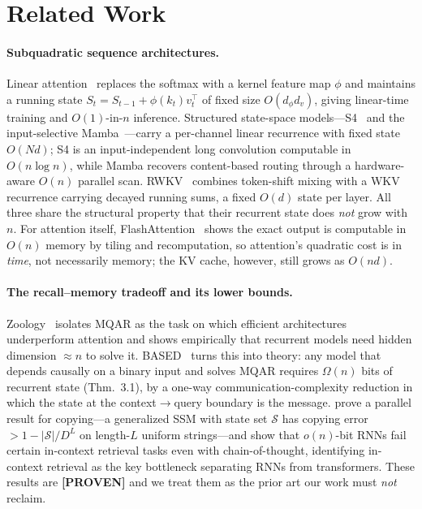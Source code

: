 \section{Related Work}

\paragraph{Subquadratic sequence architectures.}
Linear attention~\citep{katharopoulos2020transformers} replaces the softmax with a kernel
feature map $\phi$ and maintains a running state $S_t = S_{t-1} + \phi(k_t) v_t^\top$ of fixed
size $O(d_\phi d_v)$, giving linear-time training and $O(1)$-in-$n$ inference. Structured
state-space models---S4~\citep{gu2022s4} and the input-selective
Mamba~\citep{gu2023mamba}---carry a per-channel linear recurrence with fixed state $O(Nd)$;
S4 is an input-independent long convolution computable in $O(n\log n)$, while Mamba recovers
content-based routing through a hardware-aware $O(n)$ parallel scan.
RWKV~\citep{peng2023rwkv} combines token-shift mixing with a WKV recurrence carrying decayed
running sums, a fixed $O(d)$ state per layer. All three share the structural property that
their recurrent state does \emph{not} grow with $n$. For attention itself,
FlashAttention~\citep{dao2022flashattention} shows the exact output is computable in $O(n)$
memory by tiling and recomputation, so attention's quadratic cost is in \emph{time}, not
necessarily memory; the KV cache, however, still grows as $O(nd)$.

\paragraph{The recall--memory tradeoff and its lower bounds.}
Zoology~\citep{arora2024zoology} isolates MQAR as the task on which efficient architectures
underperform attention and shows empirically that recurrent models need hidden dimension
$\approx n$ to solve it. BASED~\citep{arora2024based} turns this into theory: any model that
depends causally on a binary input and solves MQAR requires $\Omega(n)$ bits of recurrent state
(Thm.~3.1), by a one-way communication-complexity reduction in which the state at the
context$\rightarrow$query boundary is the message. \citet{jelassi2024copying} prove a parallel
result for copying---a generalized SSM with state set $\mathcal{S}$ has copying error
$> 1 - |\mathcal{S}|/D^L$ on length-$L$ uniform strings---and \citet{wen2025rnns} show that
$o(n)$-bit RNNs fail certain in-context retrieval tasks even with chain-of-thought, identifying
in-context retrieval as the key bottleneck separating RNNs from transformers. These results are
\textbf{[PROVEN]} and we treat them as the prior art our work must \emph{not} reclaim.

